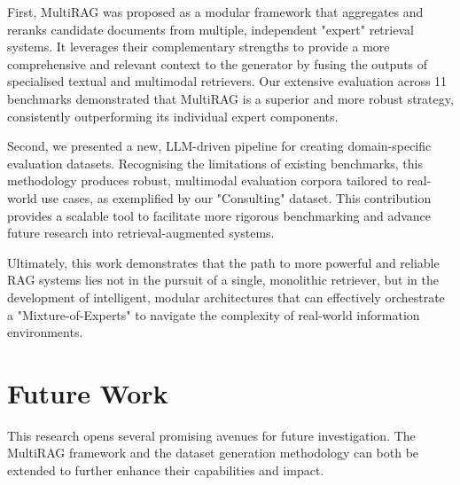 \documentclass[12pt,twoside]{report}
\begin{document}
First, MultiRAG was proposed as a modular framework that aggregates and reranks candidate documents from multiple, independent "expert" retrieval systems. It leverages their complementary strengths to provide a more comprehensive and relevant context to the generator by fusing the outputs of specialised textual and multimodal retrievers. Our extensive evaluation across 11 benchmarks demonstrated that MultiRAG is a superior and more robust strategy, consistently outperforming its individual expert components.

Second, we presented a new, LLM-driven pipeline for creating domain-specific evaluation datasets. Recognising the limitations of existing benchmarks, this methodology produces robust, multimodal evaluation corpora tailored to real-world use cases, as exemplified by our "Consulting" dataset. This contribution provides a scalable tool to facilitate more rigorous benchmarking and advance future research into retrieval-augmented systems.

Ultimately, this work demonstrates that the path to more powerful and reliable RAG systems lies not in the pursuit of a single, monolithic retriever, but in the development of intelligent, modular architectures that can effectively orchestrate a "Mixture-of-Experts" to navigate the complexity of real-world information environments.

\section{Future Work}

This research opens several promising avenues for future investigation. The MultiRAG framework and the dataset generation methodology can both be extended to further enhance their capabilities and impact.
\end{document}
